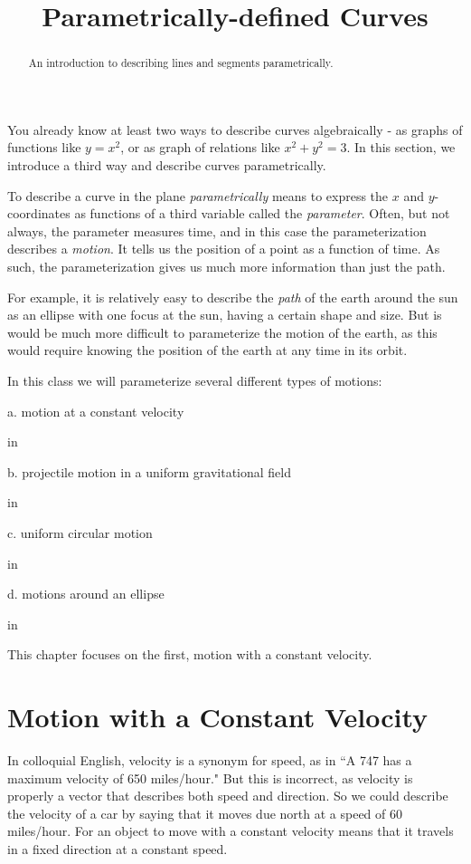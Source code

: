 \documentclass{ximera}
\title{Parametrically-defined Curves}
\newcommand{\pskip}{\vskip 0.1 in}
\begin{document}
\begin{abstract}
An introduction to describing lines and segments parametrically.
\end{abstract}
\maketitle

You already know at least two ways to describe curves algebraically - as graphs of functions like $y=x^2$, or as graph of relations like $x^2 + y^2 = 3$. In this section, we introduce a third way and describe curves parametrically. 

To describe a curve in the plane \emph{parametrically} means to express the $x$ and $y$-coordinates as functions of a third variable called the \emph{parameter}. Often, but not always, the parameter measures time, and in this case the parameterization describes a \emph{motion}. It tells us the position of a point as a function of time. As such, the parameterization gives us much more information than just the path.%

For example, it is relatively easy to describe the \emph{path} of the earth around the sun as an ellipse with one focus at the sun, having a certain shape and size. But is would be much more difficult to parameterize the motion of the earth, as this would require knowing the position of the earth at any time in its orbit.

In this class we will parameterize several different types of motions:

a. motion at a constant velocity

\pskip

b. projectile motion in a uniform gravitational field

\pskip

c. uniform circular motion

\pskip

d. motions around an ellipse

\pskip

This chapter focuses on the first, motion with a constant velocity.

\section{Motion with a Constant Velocity}

In colloquial English, velocity is a synonym for speed, as in ``A 747 has a maximum velocity of 650 miles/hour." But this is incorrect, as velocity is properly a vector that describes both speed and direction. So we could describe the velocity of a car by saying that it moves due north at a speed of 60 miles/hour. For an object to move with a constant velocity means that it travels in a fixed direction at a constant speed.
\end{document}
